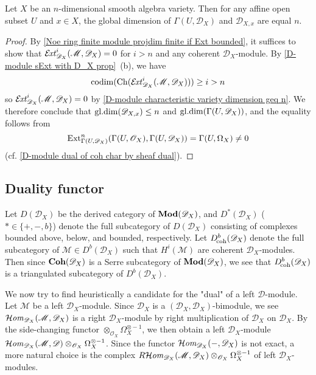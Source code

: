 \begin{theorem}\label{D-module global dimension of stalk n}
Let $X$ be an $n$-dimensional smooth algebra variety. Then for any affine open subset $U$ and $x\in X$, the global dimension of $\Gamma(U,\mathscr{D}_X)$ and $\mathscr{D}_{X,x}$ are equal $n$.
\end{theorem}
\begin{proof}
By \cref{Noe ring finite module projdim finite if Ext bounded}, it suffices to show that $\operatorname{\mathcal{E}\hspace*{-1.3pt}\textit{xt}\hspace{0.5pt}}_{\mathscr{D}_X}^i(\mathscr{M},\mathscr{D}_X)=0$ for $i>n$ and any coherent $\mathscr{D}_X$-module. By \cref{D-module sExt with D_X prop}~(b), we have
\[\mathrm{codim}(\mathrm{Ch}(\operatorname{\mathcal{E}\hspace*{-1.3pt}\textit{xt}\hspace{0.5pt}}_{\mathscr{D}_X}^i(\mathscr{M},\mathscr{D}_X)))\geq i>n\]
so $\operatorname{\mathcal{E}\hspace*{-1.3pt}\textit{xt}\hspace{0.5pt}}_{\mathscr{D}_X}^i(\mathscr{M},\mathscr{D}_X)=0$ by \cref{D-module characteristic variety dimension geq n}. We therefore conclude that $\mathrm{gl.dim}(\mathscr{D}_{X,x})\leq n$ and $\mathrm{gl.dim}(\Gamma(U,\mathscr{D}_X))$, and the equality follows from
\[\mathrm{Ext}_{\Gamma(U,\mathscr{D}_X)}^n(\Gamma(U,\mathscr{O}_{X}),\Gamma(U,\mathscr{D}_{X}))=\Gamma(U,\Omega_X)\neq 0\]
(cf. \cref{D-module dual of coh char by sheaf dual}).
\end{proof}

\subsection{Duality functor}
Let $D(\mathscr{D}_X)$ be the derived category of $\mathbf{Mod}(\mathscr{D}_X)$, and $D^*(\mathscr{D}_X)$ ($*\in\{+,-,b\}$) denote the full subcategory of $D(\mathscr{D}_X)$ consisting of complexes bounded above, below, and bounded, respectively. Let $D^b_{\!\mathrm{coh}}(\mathscr{D}_X)$ denote the full subcategory of $\mathscr{M}\in D^b(\mathscr{D}_X)$ such that $H^i(\mathscr{M})$ are coherent $\mathscr{D}_X$-modules. Then since $\mathbf{Coh}(\mathscr{D}_X)$ is a Serre subcategory of $\mathbf{Mod}(\mathscr{D}_X)$, we see that $D^b_{\!\mathrm{coh}}(\mathscr{D}_X)$ is a triangulated subcategory of $D^b(\mathscr{D}_X)$.\par
We now try to find heuristically a candidate for the "dual" of a left $\mathscr{D}$-module. Let $\mathscr{M}$ be a left $\mathscr{D}_X$-module. Since $\mathscr{D}_X$ is a $(\mathscr{D}_X,\mathscr{D}_X)$-bimodule, we see $\operatorname{\mathcal{H}\hspace*{-0.4pt}\textit{om}\hspace{0.5pt}}_{\mathscr{D}_X}(\mathscr{M},\mathscr{D}_X)$ is a right $\mathscr{D}_X$-module by right multiplication of $\mathscr{D}_X$ on $\mathscr{D}_X$. By the side-changing functor $\otimes_{\mathscr{O}_X}\Omega_X^{\otimes -1}$, we then obtain a left $\mathscr{D}_X$-module $\operatorname{\mathcal{H}\hspace*{-0.4pt}\textit{om}\hspace{0.5pt}}_{\mathscr{D}_X}(\mathscr{M},\mathscr{D})\otimes_{\mathscr{O}_X}\Omega_X^{\otimes-1}$. Since the functor $\operatorname{\mathcal{H}\hspace*{-0.4pt}\textit{om}\hspace{0.5pt}}_{\mathscr{D}_X}(-,\mathscr{D}_X)$ is not exact, a more natural choice is the complex $R\!\operatorname{\mathcal{H}\hspace*{-0.4pt}\textit{om}\hspace{0.5pt}}_{\mathscr{D}_X}(\mathscr{M},\mathscr{D}_X)\otimes_{\mathscr{O}_X}\Omega_X^{\otimes-1}$ of left $\mathscr{D}_X$-modules.

